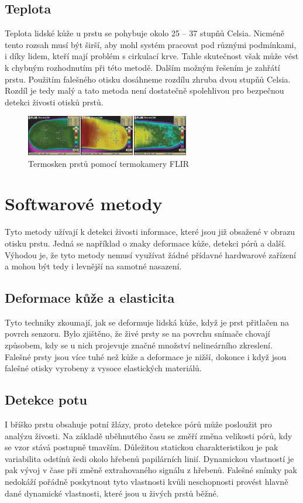 \subsection{Teplota}
Teplota lidské kůže u prstu se pohybuje okolo 25 -- 37 stupňů Celsia. Nicméně tento rozsah musí být širší, aby mohl systém pracovat pod různými podmínkami, i díky lidem, kteří mají problém s cirkulací krve. Tahle skutečnost však může vést k chybným rozhodnutím při této metodě. Dalším možným řešením je zahřátí prstu. Použitím falešného otisku dosáhneme rozdílu zhruba dvou stupňů Celsia. Rozdíl je tedy malý a tato metoda není dostatečně spolehlivou pro bezpečnou detekci živosti otisků prstů. \cite{AdvancedBiometricsTechnologies2011}
\begin{figure}[!htbp]
    \centering
    \includegraphics[width=270px]{obrazky-figures/thermoscan.PNG}
    \caption{Termosken prstů pomocí termokamery FLIR \cite{AdvancedBiometricsTechnologies2011}}
\end{figure}

\section{Softwarové metody}
Tyto metody užívají k detekci živosti informace, které jsou již obsažené v obrazu otisku prstu. Jedná se například o znaky deformace kůže, detekci pórů a další. Výhodou je, že tyto metody nemusí využívat žádné přídavné hardwarové zařízení a mohou být tedy i levnější na samotné nasazení.

\subsection{Deformace kůže a elasticita}
Tyto techniky zkoumají, jak se deformuje lidská kůže, když je prst přitlačen na povrch senzoru. Bylo zjištěno, že živé prsty se na povrchu snímače chovají způsobem, kdy se u nich projevuje značné množství nelineárního zkreslení. Falešné prsty jsou více tuhé než kůže a deformace je nižší, dokonce i když jsou falešné otisky vyrobeny z vysoce elastických materiálů. \cite{BiometricsEncyclopedia2009}

\subsection{Detekce potu}
I bříško prstu obsahuje potní žlázy, proto detekce pórů může posloužit pro analýzu živosti. Na základě uběhnutého času se změří změna velikosti pórů, kdy se vzor stává postupně tmavším. Důležitou statickou charakteristikou je pak variabilita odstínů šedi okolo hřebenů papilárních linií. Dynamickou vlastností je pak vývoj v čase při změně extrahovaného signálu z hřebenů. Falešné snímky pak nedokáží pořádně poskytnout tyto vlastnosti kvůli neschopnosti provést hlavně dané dynamické vlastnosti, které jsou u živých prstů běžné. \cite{PoresResearch}

